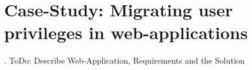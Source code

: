 
\section{Case-Study: Migrating user privileges in web-applications}
\label{sec:casestudy}.
ToDo: Describe Web-Application, Requirements and the Solution
